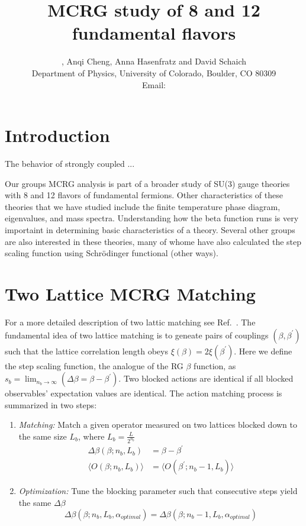 \documentclass{PoS}
\title{MCRG study of 8 and 12 fundamental flavors}
\author{\speaker{Gregory Petropoulos}, Anqi Cheng, Anna Hasenfratz and David Schaich \\
  Department of Physics, University of Colorado, Boulder, CO 80309 \\
  Email: \email{gregory.petropoulos@colorado.edu}
}
\newcommand{\refcite}[1]{Ref.~\cite{#1}}
\begin{document}
\section{Introduction}
The behavior of strongly coupled ...

Our groups MCRG analysis is part of a broader study of SU(3) gauge theories with 8 and 12 flavors of fundamental fermions.
Other characteristics of these theories that we have studied include the finite temperature phase diagram, eigenvalues, and mass spectra.
Understanding how the beta function runs is very importaint in determining basic characteristics of a theory.
Several other groups are also interested in these theories, many of whome have also calculated the step scaling function using Schr\"odinger functional (other ways).

\section{Two Lattice MCRG Matching}
For a more detailed description of two lattic matching see \refcite{annaMCRG}.
The fundamental idea of two lattice matching is to geneate pairs of couplings $(\beta, \beta^{\prime})$ such that the lattice correlation length obeys $\xi(\beta)=2\xi(\beta^{\prime})$.
Here we define the step scaling function, the analogue of the RG $\beta$ function, as $s_b= \lim_{n_b\to\infty}(\Delta\beta=\beta - \beta^{\prime})$.
Two blocked actions are identical if all blocked observables' expectation values are identical.
The action matching process is summarized in two steps:

\begin{enumerate}
  \item \emph{Matching:}  Match a given operator measured on two lattices blocked down to the same size $L_b$, where $L_b=\frac{L}{2^{n_b}}$
  \begin{align}
    \Delta\beta(\beta;n_b,L_b) & = \beta-\beta^{\prime} \\
    \langle O(\beta;n_b,L_b)\rangle & = \langle O(\beta^{\prime};n_b-1,L_b)\rangle
  \end{align}
  \item \emph{Optimization:}  Tune the blocking parameter such that consecutive steps yield the same $\Delta\beta$
  \begin{equation}
    \Delta\beta(\beta;n_b,L_b,\alpha_{optimal})=\Delta\beta(\beta;n_b-1,L_b,\alpha_{optimal})
  \end{equation}
\end{enumerate}
\end{document}
